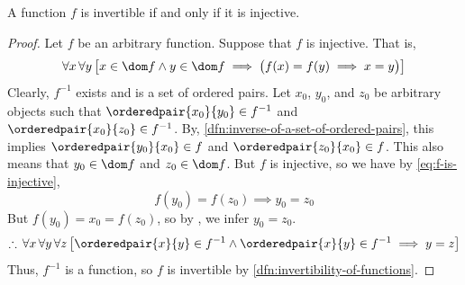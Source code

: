 \begin{thm}
    \label{thm:a-function-is-invertible-if-and-only-if-it-is-injective}
    A function \( f \) is invertible if and only if it is injective.
\end{thm}

\begin{proof}
    Let \( f \) be an arbitrary function. Suppose that \( f \) is injective. That is,
    \begin{equation}
        \label{eq:f-is-injective}
        \forall x \, \forall y \, \big[ x \in \dom f \land y \in \dom f \implies \big( f(x) = f(y) \implies x = y \big) \big]
    \end{equation}
    Clearly, \( f^{-1} \) exists and is a set of ordered pairs. Let \( x_{0} \), \( y_{0} \), and \( z_{0} \) be arbitrary
    objects such that \( \orderedpair{x_{0}}{y_{0}} \in f^{-1} \) and \( \orderedpair{x_{0}}{z_{0}} \in f^{-1} \). By,
    \cref{dfn:inverse-of-a-set-of-ordered-pairs}, this implies \( \orderedpair{y_{0}}{x_{0}} \in f \) and \( \orderedpair{z_{0}}{x_{0}} \in f \).
    This also means that \( y_{0} \in \dom f \) and \( z_{0} \in \dom f \). But \( f \) is injective, so we have by \eqref{eq:f-is-injective},
    \begin{equation*}
        f(y_{0}) = f(z_{0}) \implies y_{0} = z_{0}
    \end{equation*}
    But \( f(y_{0}) = x_{0} = f(z_{0}) \), so by , we infer \( y_{0} = z_{0} \).
    \begin{equation*}
        \therefore \, \forall x \, \forall y \, \forall z \, \big[ \orderedpair{x}{y} \in f^{-1} \land
        \orderedpair{x}{y} \in f^{-1} \implies y = z \big]
    \end{equation*}
    Thus, \( f^{-1} \) is a function, so \( f \) is invertible by \cref{dfn:invertibility-of-functions}.


\end{proof}

